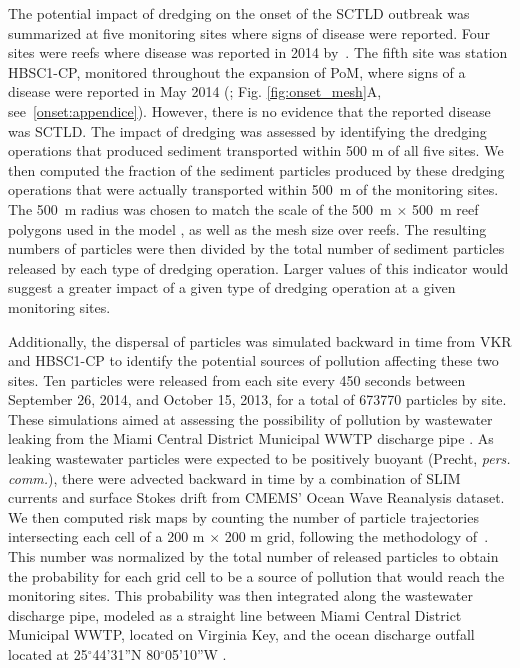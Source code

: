 \documentclass[preprint,12pt,authoryear]{elsarticle}
\begin{document}
The potential impact of dredging on the onset of the SCTLD outbreak was summarized at five monitoring sites where signs of disease were reported. Four sites were reefs where disease was reported in 2014 by~\cite{precht2016unprecedented}. The fifth site was station HBSC1-CP, monitored throughout the expansion of PoM, where signs of a disease were reported in May 2014 (\citealp{dial2017}; Fig. \ref{fig:onset_mesh}A, see~\ref{onset:appendice}). However, there is no evidence that the reported disease was SCTLD. The impact of dredging was assessed by identifying the dredging operations that produced sediment transported within 500 m of all five sites. We then computed the fraction of the sediment particles produced by these dredging operations that were actually transported within 500~m of the monitoring sites. The 500~m radius was chosen to match the scale of the 500~m $\times$ 500~m reef polygons used in the model \citep{dobbelaere2020coupled}, as well as the mesh size over reefs. The resulting numbers of particles were then divided by the total number of sediment particles released by each type of dredging operation. Larger values of this indicator would suggest a greater impact of a given type of dredging operation at a given monitoring sites.  

Additionally, the dispersal of particles was simulated backward in time from VKR and HBSC1-CP to identify the potential sources of pollution affecting these two sites. Ten particles were released from each site every 450 seconds between September 26, 2014, and October 15, 2013, for a total of 673770 particles by site. These simulations aimed at assessing the possibility of pollution by wastewater leaking from the Miami Central District Municipal WWTP discharge pipe \citep{gintert2019regional}. As leaking wastewater particles were expected to be positively buoyant (Precht, \textit{pers. comm.}), there were advected backward in time by a combination of SLIM currents and surface Stokes drift from CMEMS' Ocean Wave Reanalysis dataset. We then computed risk maps by counting the number of particle trajectories intersecting each cell of a 200 m $\times$ 200 m grid, following the methodology of~\cite{anselain2023qatar}. This number was normalized by the total number of released particles to obtain the probability for each grid cell to be a source of pollution that would reach the monitoring sites.
This probability was then integrated along the wastewater discharge pipe, modeled as a straight line between Miami Central District Municipal WWTP, located on Virginia Key, and the ocean discharge outfall located at 25$^\circ$44'31''N 80$^\circ$05'10''W \citep{koopman2006ocean}.
\end{document}
